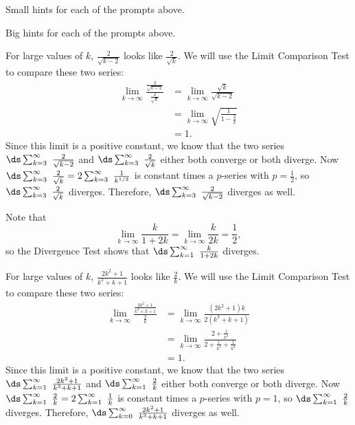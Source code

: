 \begin{smallhint}
\ba
	\item Small hints for each of the prompts above.
\ea
\end{smallhint}
\begin{bighint}
\ba
	\item Big hints for each of the prompts above.
\ea
\end{bighint}
\begin{activitySolution}
\ba
\item For large values of $k$, $\frac{2}{\sqrt{k-2}}$ looks like $\frac{2}{\sqrt{k}}$. We will use the Limit Comparison Test to compare these two series:
\begin{align*}
\lim_{k \to \infty} \frac{\frac{2}{\sqrt{k-2}}}{\frac{2}{\sqrt{k}}} &= \lim_{k \to \infty} \frac{\sqrt{k}}{\sqrt{k-2}} \\
    &= \lim_{k \to \infty} \sqrt{\frac{1}{1-\frac{2}{k}}} \\
    &= 1.
\end{align*}
Since this limit is a positive constant, we know that the two series $\ds \sum_{k=3}^{\infty} \ \frac{2}{\sqrt{k-2}}$ and $\ds \sum_{k=3}^{\infty} \ \frac{2}{\sqrt{k}}$ either both converge or both diverge. Now $\ds \sum_{k=3}^{\infty} \ \frac{2}{\sqrt{k}} = 2\sum_{k=3}^{\infty} \ \frac{1}{k^{1/2}}$ is constant times a $p$-series with $p=\frac{1}{2}$, so $\ds \sum_{k=3}^{\infty} \ \frac{2}{\sqrt{k}}$ diverges. Therefore, $\ds \sum_{k=3}^{\infty} \ \frac{2}{\sqrt{k-2}}$ diverges as well.
	
\item Note that
\[ \lim_{k \to \infty} \frac{k}{1+2k} = \lim_{k \to \infty} \frac{k}{2k} = \frac{1}{2},\]
so the Divergence Test shows that $\ds \sum_{k=1}^{\infty} \ \frac{k}{1+2k}$ diverges.

\item For large values of $k$, $\frac{2k^2+1}{k^3+k+1}$ looks like $\frac{2}{k}$. We will use the Limit Comparison Test to compare these two series:
\begin{align*}
\lim_{k \to \infty} \frac{\frac{2k^2+1}{k^3+k+1}}{\frac{2}{k}} &= \lim_{k \to \infty} \frac{(2k^2+1)k}{2(k^3+k+1)} \\
    &= \lim_{k \to \infty} \frac{2 + \frac{1}{k^2}}{2+\frac{1}{k^2}+\frac{1}{k^3}} \\
    &= 1.
\end{align*}
Since this limit is a positive constant, we know that the two series $\ds \sum_{k=1}^{\infty} \ \frac{2k^2+1}{k^3+k+1}$ and $\ds \sum_{k=1}^{\infty} \ \frac{2}{k}$ either both converge or both diverge. Now $\ds \sum_{k=1}^{\infty} \ \frac{2}{k} = 2\sum_{k=1}^{\infty} \ \frac{1}{k}$ is constant times a $p$-series with $p=1$, so $\ds \sum_{k=1}^{\infty} \ \frac{2}{k}$ diverges. Therefore, $\ds \sum_{k=0}^{\infty} \ \frac{2k^2+1}{k^3+k+1}$ diverges as well.


\end{activitySolution}
